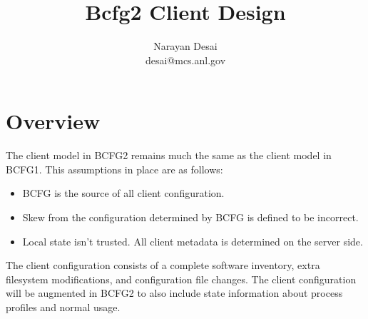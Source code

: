 \documentclass[11pt]{article}
\title{Bcfg2 Client Design}
\author{Narayan Desai \\ desai@mcs.anl.gov}
\begin{document}
\maketitle

\section{Overview}
The client model in BCFG2 remains much the same as the client model in
BCFG1. This assumptions in place are as follows:
\begin{itemize}
\item{BCFG is the source of all client configuration.}
\item{Skew from the configuration determined by BCFG is defined to be
    incorrect.} 
\item{Local state isn't trusted. All client metadata is determined on
    the server side.}
\end{itemize}

The client configuration consists of a complete software inventory,
extra filesystem modifications, and configuration file changes. The
client configuration will be augmented in BCFG2 to also include state
information about process profiles and normal usage.
\end{document}
